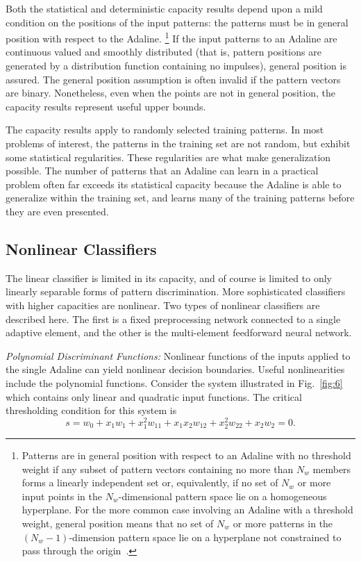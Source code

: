 \documentclass[10pt,twocolumn]{article}
\begin{document}
Both the statistical and deterministic capacity results depend upon a mild
condition on the positions of the input patterns: the patterns must be in
general position with respect to the Adaline.%
\footnote{Patterns are in general position with respect to an Adaline with no
threshold weight if any subset of pattern vectors containing no more than $N_w$
members forms a linearly independent set or, equivalently, if no set of $N_w$ or
more input points in the $N_w$-dimensional pattern space lie on a homogeneous
hyperplane. For the more common case involving an Adaline with a threshold
weight, general position means that no set of $N_w$ or more patterns in the
$(N_w-1)$-dimension pattern space lie on a hyperplane not constrained to pass
through the origin~\cite{cover64,nilsson}.}
If the input patterns to an Adaline are continuous valued and smoothly
distributed (that is, pattern positions are generated by a distribution function
containing no impulses), general position is assured. The general position
assumption is often invalid if the pattern vectors are binary. Nonetheless, even
when the points are not in general position, the capacity results represent
useful upper bounds.

The capacity results apply to randomly selected training patterns. In most
problems of interest, the patterns in the training set are not random, but
exhibit some statistical regularities. These regularities are what make
generalization possible. The number of patterns that an Adaline can learn in a
practical problem often far exceeds its statistical capacity because the Adaline
is able to generalize within the training set, and learns many of the training
patterns before they are even presented.

\subsection{Nonlinear Classifiers}
The linear classifier is limited in its capacity, and of course is limited to
only linearly separable forms of pattern discrimination. More sophisticated
classifiers with higher capacities are nonlinear. Two types of nonlinear
classifiers are described here. The first is a fixed preprocessing network
connected to a single adaptive element, and the other is the multi-element
feedforward neural network.

\textit{Polynomial Discriminant Functions:} Nonlinear functions of the inputs
applied to the single Adaline can yield nonlinear decision boundaries. Useful
nonlinearities include the polynomial functions. Consider the system illustrated
in Fig.~\ref{fig:6} which contains only linear and quadratic input functions.
The critical thresholding condition for this system is
\begin{equation}
s = w_0 + x_1 w_1 + x_1^2 w_{11} + x_1 x_2 w_{12} + x_2^2 w_{22} + x_2 w_2 = 0. \tag{7}
\end{equation}
\end{document}

